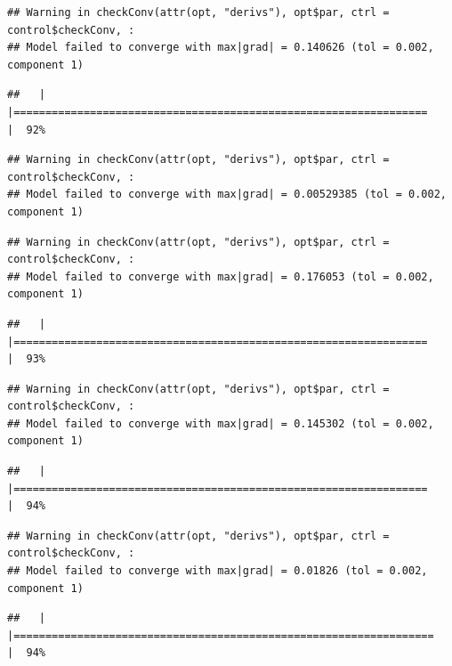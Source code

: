 \documentclass[
  12pt,
]{book}
\begin{document}
\begin{verbatim}
## Warning in checkConv(attr(opt, "derivs"), opt$par, ctrl = control$checkConv, :
## Model failed to converge with max|grad| = 0.140626 (tol = 0.002, component 1)
\end{verbatim}

\begin{verbatim}
##   |                                                                              |=================================================================     |  92%
\end{verbatim}

\begin{verbatim}
## Warning in checkConv(attr(opt, "derivs"), opt$par, ctrl = control$checkConv, :
## Model failed to converge with max|grad| = 0.00529385 (tol = 0.002, component 1)
\end{verbatim}

\begin{verbatim}
## Warning in checkConv(attr(opt, "derivs"), opt$par, ctrl = control$checkConv, :
## Model failed to converge with max|grad| = 0.176053 (tol = 0.002, component 1)
\end{verbatim}

\begin{verbatim}
##   |                                                                              |=================================================================     |  93%
\end{verbatim}

\begin{verbatim}
## Warning in checkConv(attr(opt, "derivs"), opt$par, ctrl = control$checkConv, :
## Model failed to converge with max|grad| = 0.145302 (tol = 0.002, component 1)
\end{verbatim}

\begin{verbatim}
##   |                                                                              |=================================================================     |  94%
\end{verbatim}

\begin{verbatim}
## Warning in checkConv(attr(opt, "derivs"), opt$par, ctrl = control$checkConv, :
## Model failed to converge with max|grad| = 0.01826 (tol = 0.002, component 1)
\end{verbatim}

\begin{verbatim}
##   |                                                                              |==================================================================    |  94%
\end{verbatim}
\end{document}

